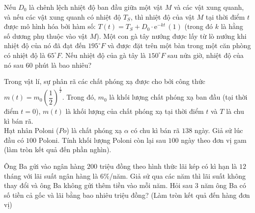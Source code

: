 \begin{bt}%
	Nếu $D_0$ là chênh lệch nhiệt độ ban đầu giữa một vật $M$ và các vật xung  quanh, và nếu các vật xung quanh có nhiệt độ $T_S$, thì nhiệt độ của vật $M$ tại thời điểm $t$ được mô hình hóa bởi hàm số: $T(t)=T_S+D_0 \cdot\mathrm{e}^{-kt}\,(1)$ (trong đó $k$ là hằng số dương phụ thuộc vào vật $M$).
	Một con gà tây nướng được lấy từ lò nướng khi nhiệt độ của nó đã  đạt đến $195^\circ F$ và được đặt trên một bàn trong một căn phòng có nhiệt độ là $65^\circ F$.
	Nếu nhiệt độ của gà tây là $150^\circ F$ sau nửa giờ, nhiệt độ của nó sau $60$  phút là bao nhiêu?
\end{bt}

\begin{ex}%
	Trong vật lí, sự phân rã các chất phóng xạ được cho bởi công thức $m(t) = m_0 \left(\dfrac{1}{2}\right)^{\tfrac{t}{T}}$. Trong đó, $m_0$ là khối lượng chất phóng xạ ban đầu (tại thời điểm $t= 0$), $m(t)$ là khối lượng của chất phóng xạ tại thời điểm $t$ và $T$ là chu kì bán rã.\\ 
	Hạt nhân Poloni ($Po$) là chất phóng xạ $\alpha$ có chu kì bán rã $138$ ngày. Giả sử lúc đầu có $100$ Poloni. Tính khối lượng Poloni còn lại sau $100$ ngày theo đơn vị gam (làm  tròn kết quả đến phần nghìn).
\end{ex}

\begin{ex}%
	Ông Ba gửi vào ngân hàng $200$ triệu đồng theo hình thức lãi kép có kì hạn là  $12$ tháng với lãi suất ngân hàng là $6\%$/năm. Giả sử qua các năm thì lãi suất không thay đổi và ông Ba không gửi thêm tiền vào mỗi năm. Hỏi sau $3$ năm ông Ba có số tiền cả gốc và lãi bằng bao nhiêu triệu đồng? (Làm tròn kết quả đến hàng đơn vị)
\end{ex}

